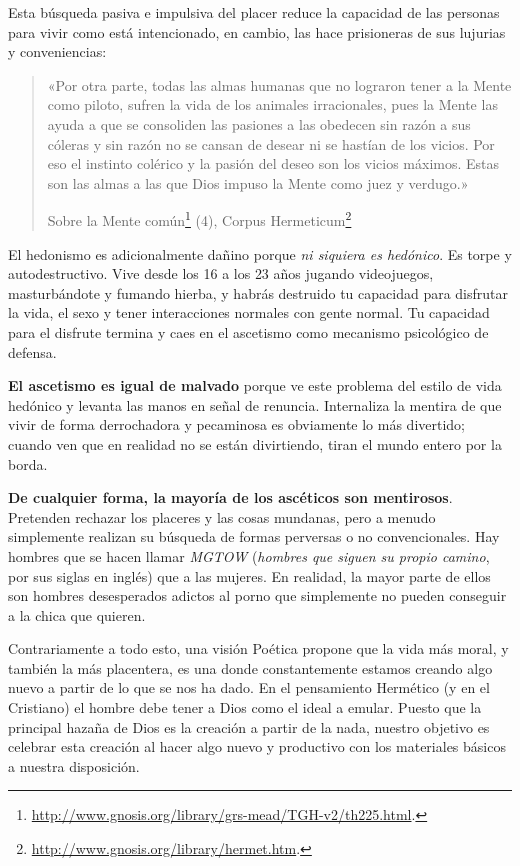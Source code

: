 \documentclass{article}
\begin{document}
	Esta búsqueda pasiva e impulsiva del placer reduce la capacidad de
	las personas para vivir como está intencionado, en cambio, las hace
	prisioneras de sus lujurias y conveniencias:

	\blockquote[Sobre la Mente
	común\footnote{\url{http://www.gnosis.org/library/grs-mead/TGH-v2/th225.html}.}
	(4), Corpus Hermeticum\footnote{\url{http://www.gnosis.org/library/hermet.htm}.}
	\cite{dos}]
	{«Por otra parte, todas las almas humanas que no lograron tener a
	la Mente como piloto, sufren la vida de los animales
	irracionales, pues la Mente las ayuda a que se consoliden las
	pasiones a las obedecen sin razón a sus cóleras y sin razón no
	se cansan de desear ni se hastían de los vicios. Por eso el
	instinto colérico y la pasión del deseo son los vicios máximos.
	Estas son las almas a las que Dios impuso la Mente como juez y
	verdugo.»}

	El hedonismo es adicionalmente dañino porque \textit{ni siquiera es
	hedónico}. Es torpe y autodestructivo. Vive desde los 16 a los 23
	años jugando videojuegos, masturbándote y fumando hierba, y habrás
	destruido tu capacidad para disfrutar la vida, el sexo y tener
	interacciones normales con gente normal. Tu capacidad para el disfrute
	termina y caes en el ascetismo como mecanismo psicológico de defensa.

	\textbf{El ascetismo es igual de malvado} porque ve este problema del
	estilo de vida hedónico y levanta las manos en señal de renuncia.
	Internaliza la mentira de que vivir de forma derrochadora y pecaminosa
	es obviamente lo más divertido; cuando ven que en realidad no se están
	divirtiendo, tiran el mundo entero por la borda.

	\textbf{De cualquier forma, la mayoría de los ascéticos son mentirosos}.
	Pretenden rechazar los placeres y las cosas mundanas, pero a menudo
	simplemente realizan su búsqueda de formas perversas o no convencionales.
	Hay hombres que se hacen llamar \textit{MGTOW} (\textit{hombres que
	siguen su propio camino}, por sus siglas en inglés) que
	 a las mujeres. En realidad, la mayor parte de
	ellos son hombres desesperados adictos al porno que simplemente no
	pueden conseguir a la chica que quieren.

	\newpage

	Contrariamente a todo esto, una visión Poética propone que la
	vida más moral, y también la más placentera, es una donde constantemente
	estamos creando algo nuevo a partir de lo que se nos ha dado.
	En el pensamiento Hermético (y en el Cristiano) el hombre debe tener
	a Dios como el ideal a emular. Puesto que la principal hazaña de Dios
	es la creación a partir de la nada, nuestro objetivo es celebrar esta
	creación al hacer algo nuevo y productivo con los materiales básicos
	a nuestra disposición.
\end{document}
